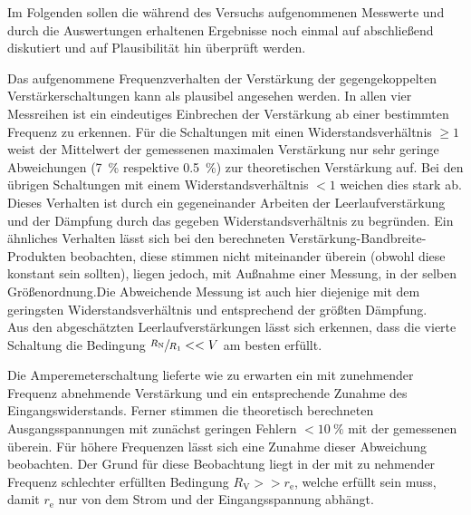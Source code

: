Im Folgenden sollen die während des Versuchs aufgenommenen Messwerte und durch 
die Auswertungen erhaltenen Ergebnisse noch einmal auf abschließend diskutiert 
und auf Plausibilität hin überprüft werden.

Das aufgenommene Frequenzverhalten der Verstärkung der gegengekoppelten Verstärkerschaltungen 
kann als plausibel angesehen werden. In allen vier Messreihen ist ein eindeutiges Einbrechen
der Verstärkung ab einer bestimmten Frequenz zu erkennen. Für die Schaltungen mit 
einen Widerstandsverhältnis $\geq 1$ weist der Mittelwert der gemessenen maximalen Verstärkung 
nur sehr geringe Abweichungen  (\SI{7}{\percent} respektive \SI{0.5}{\percent}) zur theoretischen 
Verstärkung auf. Bei den übrigen Schaltungen mit einem Widerstandsverhältnis $< 1$ weichen dies stark
ab. Dieses Verhalten ist durch ein gegeneinander Arbeiten der Leerlaufverstärkung und der Dämpfung
durch das gegeben Widerstandsverhältnis zu begründen.
Ein ähnliches Verhalten lässt sich bei den berechneten Verstärkung-Bandbreite-Produkten beobachten,
diese stimmen nicht miteinander überein (obwohl diese konstant sein sollten), liegen jedoch, mit Außnahme
einer Messung, in der selben Größenordnung.Die Abweichende Messung ist auch hier diejenige mit dem geringsten 
Widerstandsverhältnis und entsprechend der größten Dämpfung.\\
Aus den abgeschätzten Leerlaufverstärkungen lässt sich erkennen, dass die vierte Schaltung die
Bedingung $\sfrac{R_{\mathrm{N}}}{R_1} << V$ am besten erfüllt.
 
Die Amperemeterschaltung lieferte wie zu erwarten ein mit zunehmender Frequenz abnehmende Verstärkung 
und ein entsprechende Zunahme des Eingangswiderstands. Ferner stimmen die theoretisch  
berechneten Ausgangsspannungen mit zunächst geringen Fehlern $< \SI{10}{\percent}$ mit der gemessenen überein.
Für höhere Frequenzen lässt sich eine Zunahme dieser Abweichung beobachten. Der Grund für diese Beobachtung liegt in 
der mit zu nehmender Frequenz schlechter erfüllten Bedingung $R_{\mathrm{V}} >> r_{\mathrm{e}}$, welche
erfüllt sein muss, damit $r_{\mathrm{e}}$  nur von dem Strom und der Eingangsspannung abhängt.

